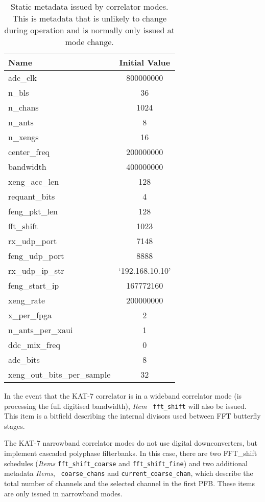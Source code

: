 \documentclass[11pt,english,twoside]{article}
\begin{document}
\begin{table}[htbp]
\caption[Correlator static metadata]{Static metadata issued by correlator modes. This is metadata that is unlikely to change during operation
and is normally only issued at mode change.}
\begin{center}
\begin{tabular}{|l|c|} \hline
{\bf Name}       & {\bf Initial Value} \\ \hline
adc\_clk         & 800000000\\ \hline
n\_bls           & 36 \\ \hline
n\_chans         & 1024 \\ \hline
n\_ants          & 8 \\ \hline
n\_xengs         & 16 \\ \hline
center\_freq     & 200000000 \\ \hline
bandwidth        & 400000000 \\ \hline
xeng\_acc\_len   & 128 \\ \hline
requant\_bits    & 4 \\ \hline
feng\_pkt\_len   & 128 \\ \hline
fft\_shift       & 1023 \\ \hline
rx\_udp\_port    & 7148 \\ \hline
feng\_udp\_port  & 8888 \\ \hline
rx\_udp\_ip\_str & `192.168.10.10' \\ \hline
feng\_start\_ip  & 167772160 \\ \hline
xeng\_rate       & 200000000 \\ \hline
x\_per\_fpga     & 2 \\ \hline
n\_ants\_per\_xaui & 1 \\ \hline
ddc\_mix\_freq   & 0 \\ \hline
adc\_bits        & 8 \\ \hline
xeng\_out\_bits\_per\_sample & 32 \\ \hline
\end{tabular}
\end{center}
\label{tab:static}
\end{table}%

In the event that the KAT-7 correlator is in a wideband correlator mode (is processing the full digitised bandwidth), \emph{Item} {\tt
fft\_shift} will also be issued. This item is a bitfield describing the internal divisors used between FFT butterfly stages.

The KAT-7 narrowband correlator modes do not use digital downconverters, but implement cascaded polyphase filterbanks. In this case, there are
two FFT\_shift schedules (\emph{Items} {\tt fft\_shift\_coarse} and {\tt fft\_shift\_fine}) and two additional metadata \emph{Items}, {\tt
coarse\_chans} and {\tt current\_coarse\_chan}, which describe the total number of channels and the selected channel in the first PFB. These
items are only issued in narrowband modes.
\end{document}
